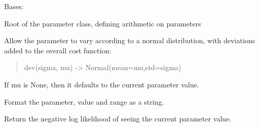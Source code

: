 \documentclass[letterpaper,10pt,english]{sphinxmanual}
\begin{document}
\begin{fulllineitems}
\label{api/mystic.parameter:refl1d.mystic.parameter.BaseParameter}
Bases: 

Root of the parameter class, defining arithmetic on parameters

\begin{fulllineitems}
\label{api/mystic.parameter:refl1d.mystic.parameter.BaseParameter.dev}
Allow the parameter to vary according to a normal distribution, with
deviations added to the overall cost function:
\begin{quote}

dev(sigma, mu) -\textgreater{} Normal(mean=mu,std=sigma)
\end{quote}

If mu is None, then it defaults to the current parameter value.

\end{fulllineitems}


\begin{fulllineitems}
\label{api/mystic.parameter:refl1d.mystic.parameter.BaseParameter.format}
Format the parameter, value and range as a string.

\end{fulllineitems}


\begin{fulllineitems}
\label{api/mystic.parameter:refl1d.mystic.parameter.BaseParameter.nllf}
Return the negative log likelihood of seeing the current parameter value.

\end{fulllineitems}


\begin{fulllineitems}
\label{api/mystic.parameter:refl1d.mystic.parameter.BaseParameter.parameters}
\end{fulllineitems}


\end{fulllineitems}
\end{document}
